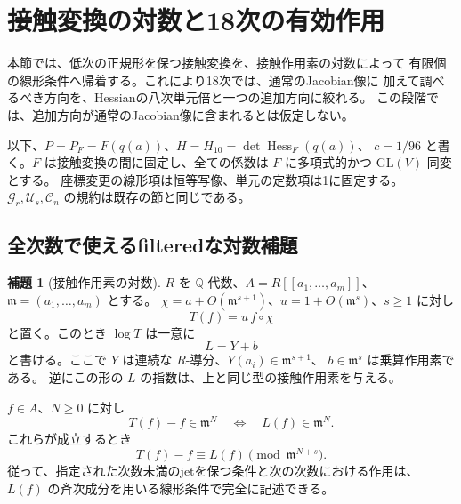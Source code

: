 \documentclass[a4paper,11pt]{ltjsarticle}
\theoremstyle{definition}
\newtheorem{lemma}[theorem]{補題}
\begin{document}



\section{接触変換の対数と18次の有効作用}
\label{sec:v14-log-contact}

本節では、低次の正規形を保つ接触変換を、接触作用素の対数によって
有限個の線形条件へ帰着する。これにより18次では、通常のJacobian像に
加えて調べるべき方向を、Hessianの八次単元倍と一つの追加方向に絞れる。
この段階では、追加方向が通常のJacobian像に含まれるとは仮定しない。

以下、$P=P_F=F(q(a))$、$H=H_{10}=\det\operatorname{Hess}_F(q(a))$、
$c=1/96$ と書く。$F$ は接触変換の間に固定し、全ての係数は
$F$ に多項式的かつ $\mathrm{GL}(V)$ 同変とする。
座標変更の線形項は恒等写像、単元の定数項は1に固定する。
$\mathcal G_r,\mathcal U_s,\mathcal C_n$ の規約は既存の節と同じである。

\subsection{全次数で使えるfilteredな対数補題}

\begin{lemma}[接触作用素の対数]
\label{lem:v14-contact-logarithm}
$R$ を $\mathbb Q$-代数、$A=R[[a_1,\ldots,a_m]]$、
$\mathfrak m=(a_1,\ldots,a_m)$ とする。
$\chi=a+O(\mathfrak m^{s+1})$、$u=1+O(\mathfrak m^s)$、$s\ge1$ に対し
\[
 T(f)=u\,f\circ\chi
\]
と置く。このとき $\log T$ は一意に
\[
 L=Y+b
\]
と書ける。ここで $Y$ は連続な $R$-導分、$Y(a_i)\in\mathfrak m^{s+1}$、
$b\in\mathfrak m^s$ は乗算作用素である。
逆にこの形の $L$ の指数は、上と同じ型の接触作用素を与える。

$f\in A$、$N\ge0$ に対し
\[
 T(f)-f\in\mathfrak m^N\quad\Longleftrightarrow\quad
 L(f)\in\mathfrak m^N.
\]
これらが成立するとき
\[
 T(f)-f\equiv L(f)\pmod{\mathfrak m^{N+s}}.
\]
従って、指定された次数未満のjetを保つ条件と次の次数における作用は、
$L(f)$ の斉次成分を用いる線形条件で完全に記述できる。
\end{lemma}
\end{document}
